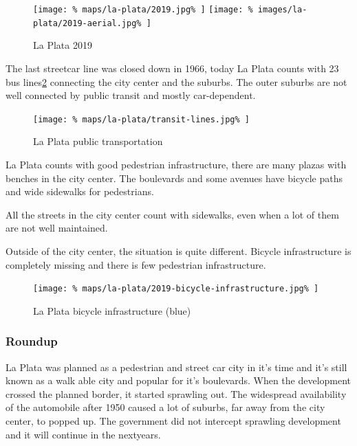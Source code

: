 \documentclass[twocolumn]{article}
\begin{document}
			\begin{figure}[H]
				\texttt{[image: \%
					maps/la-plata/2019.jpg\%
				]}
				\texttt{[image: \%
					images/la-plata/2019-aerial.jpg\%
				]}
				\caption{La Plata 2019\cite{OpenStreetMap:LaPlata}}
				\label{fig:map:la-plata-2019}
			\end{figure}

			The last streetcar line was closed down in 1966, today La Plata counts with 23 bus lines\ref{fig:map:la-plata-transit} connecting the city center and the suburbs.
			The outer suburbs are not well connected by public transit and mostly car-dependent.
			
			\begin{figure}[H]
				\texttt{[image: \%
					maps/la-plata/transit-lines.jpg\%
				]}
				\caption{La Plata public transportation\cite{OpenStreetMap:LaPlata}}
				\label{fig:map:la-plata-transit}
			\end{figure}
			
			La Plata counts with good pedestrian infrastructure, there are many plazas with benches in the city center. The boulevards and some avenues have bicycle paths and wide sidewalks for pedestrians.
			
			All the streets in the city center count with sidewalks, even when a lot of them are not well maintained.
			
			Outside of the city center, the situation is quite different. Bicycle infrastructure is completely missing and there is few pedestrian infrastructure.
			
			\begin{figure}[H]
				\texttt{[image: \%
					maps/la-plata/2019-bicycle-infrastructure.jpg\%
				]}
				\caption{La Plata bicycle infrastructure (blue)\cite{OpenCycleMap:LaPlata}}
				\label{fig:map:la-plata-bicycle-infrastructure}
			\end{figure}
			
			
			\subsubsection{Roundup}
			La Plata was planned as a pedestrian and street car city in it's time and it's still known as a walk able city and popular for it's boulevards.
			When the development crossed the planned border, it started sprawling out. The widespread availability of the automobile after 1950 caused a lot of suburbs, far away from the city center, to popped up. The government did not intercept sprawling development and it will continue in the nextyears. 
			
\end{document}
